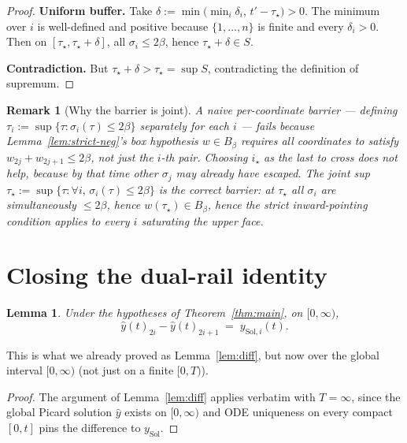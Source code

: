 \documentclass[11pt]{article}
\newtheorem{lemma}[theorem]{Lemma}
\newtheorem{remark}[theorem]{Remark}
\begin{document}
\begin{proof}
\smallskip
\noindent
\textbf{Uniform buffer.}  Take
$\delta := \min\bigl(\min_i \delta_i,\, t' - \tau_\star\bigr) > 0$.
The minimum over $i$ is well-defined and positive because
$\{1, \dots, n\}$ is finite and every $\delta_i > 0$.  Then on
$[\tau_\star, \tau_\star + \delta]$, all $\sigma_i \le 2\beta$, hence
$\tau_\star + \delta \in S$.

\smallskip
\noindent
\textbf{Contradiction.}  But $\tau_\star + \delta > \tau_\star = \sup S$,
contradicting the definition of supremum.\qedhere
\end{proof}

\begin{remark}[Why the barrier is joint]
A naive per-coordinate barrier --- defining
$\tau_i := \sup\{\tau : \sigma_i(\tau) \le 2\beta\}$ separately for
each $i$ --- fails because Lemma~\ref{lem:strict-neg}'s box hypothesis
$w \in B_\beta$ requires \emph{all} coordinates to satisfy
$w_{2j} + w_{2j+1} \le 2\beta$, not just the $i$-th pair.  Choosing
$i_\star$ as the last to cross does not help, because by that time
other $\sigma_j$ may already have escaped.  The joint sup
$\tau_\star := \sup\{\tau : \forall i,\,\sigma_i(\tau) \le 2\beta\}$
is the correct barrier: at $\tau_\star$ all $\sigma_i$ are
simultaneously $\le 2\beta$, hence $w(\tau_\star) \in B_\beta$, hence
the strict inward-pointing condition applies to every $i$ saturating
the upper face.
\end{remark}

\section{Closing the dual-rail identity}\label{sec:identity}

\begin{lemma}\label{lem:identity}
Under the hypotheses of Theorem~\ref{thm:main}, on $[0, \infty)$,
\[
  \widehat y(t)_{2i} - \widehat y(t)_{2i+1}
    \;=\; y_{\mathrm{Sol}, i}(t).
\]
\end{lemma}

This is what we already proved as Lemma~\ref{lem:diff}, but now over
the global interval $[0, \infty)$ (not just on a finite $[0, T)$).

\begin{proof}
The argument of Lemma~\ref{lem:diff} applies verbatim with $T =
\infty$, since the global Picard solution $\widehat y$ exists on
$[0, \infty)$ and ODE uniqueness on every compact $[0, t]$ pins the
difference to $y_{\mathrm{Sol}}$.
\end{proof}
\end{document}
